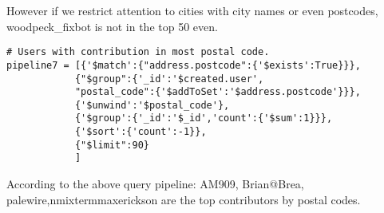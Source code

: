 \documentclass[12pt]{article}
\newenvironment{Shaded}{}{}
\begin{document}
However if we restrict attention to cities with city names or even
postcodes, woodpeck\_fixbot is not in the top 50 even.

\begin{verbatim}
# Users with contribution in most postal code.
pipeline7 = [{'$match':{"address.postcode":{'$exists':True}}},
            {"$group":{'_id':'$created.user',
            "postal_code":{'$addToSet':'$address.postcode'}}},
            {'$unwind':'$postal_code'},
            {'$group':{'_id':'$_id','count':{'$sum':1}}},
            {'$sort':{'count':-1}},
            {"$limit":90}            
            ]            
\end{verbatim}

According to the above query pipeline: AM909, Brian@Brea,
palewire,nmixtermmaxerickson are the top contributors by postal codes.

\begin{Shaded}
\begin{Highlighting}[]

\end{Highlighting}
\end{Shaded}
\end{document}
